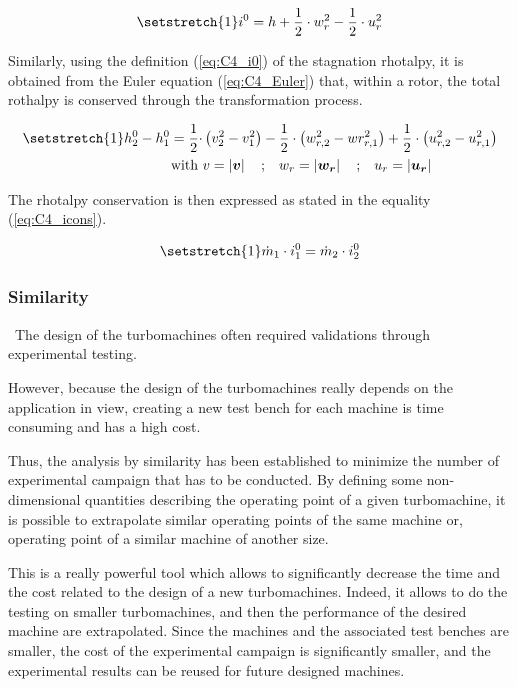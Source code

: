 \begin{equation}
    \setstretch{1}
    i^0 = h + \frac{1}{2}\cdot w_r^2 - \frac{1}{2}\cdot u_r^2 \label{eq:C4_i0}
\end{equation}

Similarly, using the definition (\ref{eq:C4_i0}) of the stagnation rhotalpy, it is obtained from the Euler equation (\ref{eq:C4_Euler}) that, within a rotor, the total rothalpy is conserved through the transformation process.

\begin{align}
    \setstretch{1}
    h_2^0 - h_1^0 = \frac{1}{2}\cdot & \left(v_2^2 - v_1^2\right) - \frac{1}{2}\cdot \left(w_{r,2}^2 - wr_{r,1}^2\right) + \frac{1}{2}\cdot \left(u_{r,2}^2 - u_{r,1}^2\right)\label{eq:C4_Euler} \\
    \text{with }                     & v = \left|\vect{v}\right|\quad\text{;}\quad  w_r = \left|\vect{w_r}\right|\quad\text{;}\quad u_r= \left|\vect{u_r}\right|\nonumber
\end{align}

The rhotalpy conservation is then expressed as stated in the equality (\ref{eq:C4_icons}).

\begin{equation}
    \setstretch{1}
    \dot{m}_1\cdot i_1^0 = \dot{m}_2\cdot i_2^0 \label{eq:C4_icons}
\end{equation} 

\subsubsection{Similarity}
\quad\ The design of the turbomachines often required validations through experimental testing.  

However, because the design of the turbomachines really depends on the application in view, creating a new test bench for each machine is time consuming and has a high cost. 

Thus, the analysis by similarity has been established to 
minimize the number of experimental campaign that has to be conducted. By defining some non-dimensional quantities describing the operating point of a given turbomachine, it is possible to extrapolate similar operating points of the same machine or, operating point of a similar machine of another size. 

This is a really powerful tool which allows to significantly decrease the time and the cost related to the design of a new turbomachines. Indeed, it allows to do the testing on smaller turbomachines, and then the performance of the desired machine are extrapolated. Since the machines and the associated test benches are smaller, the cost of the experimental campaign is significantly smaller, and the experimental results can be reused for future designed machines.

